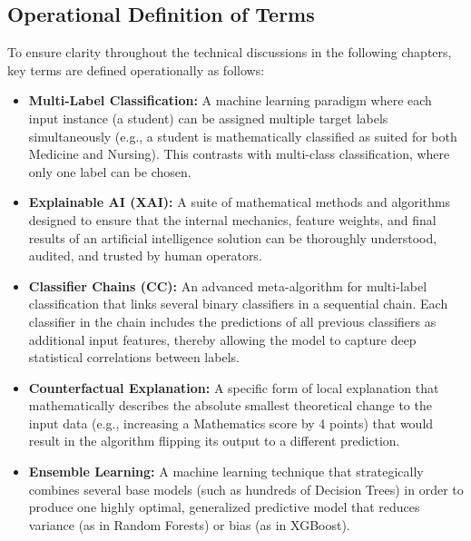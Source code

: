 \subsection{Operational Definition of Terms}
To ensure clarity throughout the technical discussions in the following chapters, key terms are defined operationally as follows:
\begin{itemize}
    \item \textbf{Multi-Label Classification:} A machine learning paradigm where each input instance (a student) can be assigned multiple target labels simultaneously (e.g., a student is mathematically classified as suited for both Medicine and Nursing). This contrasts with multi-class classification, where only one label can be chosen.
    \item \textbf{Explainable AI (XAI):} A suite of mathematical methods and algorithms designed to ensure that the internal mechanics, feature weights, and final results of an artificial intelligence solution can be thoroughly understood, audited, and trusted by human operators.
    \item \textbf{Classifier Chains (CC):} An advanced meta-algorithm for multi-label \parencite{tsoumakas2007multi} classification that links several binary classifiers in a sequential chain. Each classifier in the chain includes the predictions of all previous classifiers as additional input features, thereby allowing the model to capture deep statistical correlations between labels.
    \item \textbf{Counterfactual Explanation:} A specific form of local explanation that mathematically describes the absolute smallest theoretical change to the input data (e.g., increasing a Mathematics score by 4 points) that would result in the algorithm flipping its output to a different prediction.
    \item \textbf{Ensemble Learning:} A machine learning technique that strategically combines several base models (such as hundreds of Decision Trees) in order to produce one highly optimal, generalized predictive model that reduces variance (as in Random Forests) or bias (as in XGBoost).
\end{itemize}
